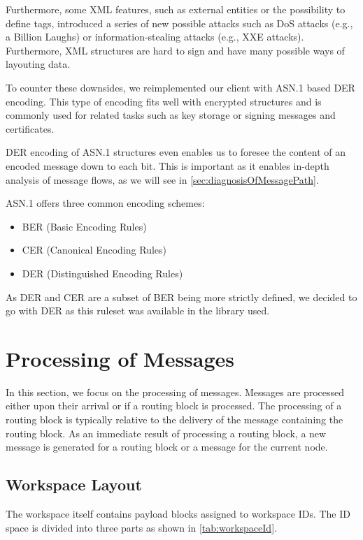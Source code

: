 Furthermore, some XML features, such as external entities or the possibility to define tags, introduced a series of new possible attacks such as DoS attacks (e.g., a Billion Laughs) or information-stealing attacks (e.g., XXE attacks). Furthermore, XML structures are hard to sign and have many possible ways of layouting data. 

To counter these downsides, we reimplemented our client with ASN.1 based DER encoding. This type of encoding fits well with encrypted structures and is commonly used for related tasks such as key storage or signing messages and certificates.

DER encoding of ASN.1 structures even enables us to foresee the content of an encoded message down to each bit. This is important as it enables in-depth analysis of message flows, as we will see in \cref{sec:diagnosisOfMessagePath}.

ASN.1 offers three common encoding schemes:
\begin{itemize}
	\item BER (Basic Encoding Rules)
	\item CER (Canonical Encoding Rules)
	\item DER (Distinguished Encoding Rules)
\end{itemize}

As DER and CER are a subset of BER being more strictly defined, we decided to go with DER as this ruleset was available in the library used.

\section{Processing of Messages\label{sec:messageProcessing}}
In this section, we focus on the processing of messages. Messages are processed either upon their arrival or if a routing block is processed. The processing of a routing block is typically relative to the delivery of the message containing the routing block. As an immediate result of processing a routing block, a new message is generated for a routing block or a message for the current node.

\subsection{Workspace Layout}
The workspace itself contains payload blocks assigned to workspace IDs. The ID space is divided into three parts as shown in \cref{tab:workspaceId}.

